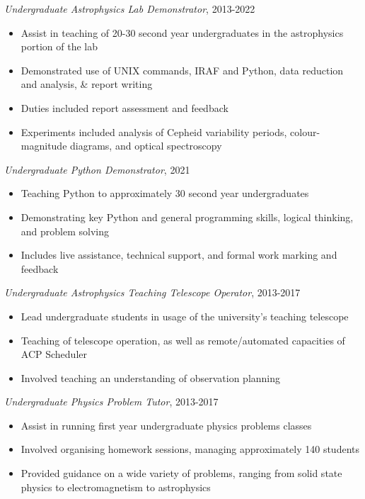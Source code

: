 \documentclass[letter, margin, 10pt]{res} %
\begin{document}
\begin{resume}
\vspace{-10pt}

{\sl Undergraduate Astrophysics Lab Demonstrator}, 2013-2022
\begin{itemize}[noitemsep,topsep=0pt,parsep=0pt,partopsep=0pt]
\item Assist in teaching of 20-30 second year undergraduates in the astrophysics portion of the lab
\item Demonstrated use of UNIX commands, IRAF and Python, data reduction and analysis, \& report writing
\item Duties included report assessment and feedback
\item Experiments included analysis of Cepheid variability periods, colour-magnitude diagrams, and optical spectroscopy
\end{itemize}

\vspace{-10pt}

{\sl Undergraduate Python Demonstrator}, 2021
\begin{itemize}[noitemsep,topsep=0pt,parsep=0pt,partopsep=0pt]
\item Teaching Python to approximately 30 second year undergraduates
\item Demonstrating key Python and general programming skills, logical thinking, and problem solving
\item Includes live assistance, technical support, and formal work marking and feedback
\end{itemize}

\vspace{-10pt}

{\sl Undergraduate Astrophysics Teaching Telescope Operator}, 2013-2017
\begin{itemize}[noitemsep,topsep=0pt,parsep=0pt,partopsep=0pt]
\item Lead undergraduate students in usage of the university's teaching telescope
\item Teaching of telescope operation, as well as remote/automated capacities of ACP Scheduler
\item Involved teaching an understanding of observation planning
\end{itemize}

\vspace{-10pt}

{\sl Undergraduate Physics Problem Tutor}, 2013-2017
\begin{itemize}[noitemsep,topsep=0pt,parsep=0pt,partopsep=0pt]
\item Assist in running first year undergraduate physics problems classes
\item Involved organising homework sessions, managing approximately 140 students
\item Provided guidance on a wide variety of problems, ranging from solid state physics to electromagnetism to astrophysics
\end{itemize}


\end{resume}
\end{document}
